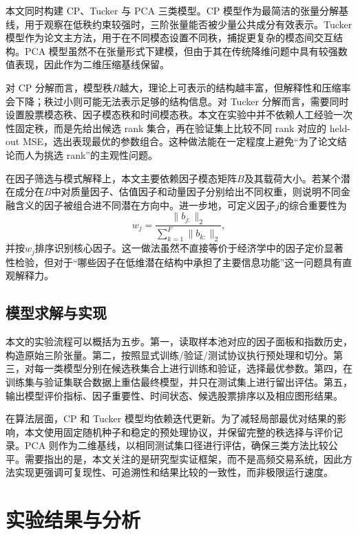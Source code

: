 本文同时构建 CP、Tucker 与 PCA 三类模型。CP 模型作为最简洁的张量分解基线，用于观察在低秩约束较强时，三阶张量能否被少量公共成分有效表示。Tucker 模型作为论文主方法，用于在不同模态设置不同秩，捕捉更复杂的模态间交互结构。PCA 模型虽然不在张量形式下建模，但由于其在传统降维问题中具有较强数值表现，因此作为二维压缩基线保留。

对 CP 分解而言，模型秩$R$越大，理论上可表示的结构越丰富，但解释性和压缩率会下降；秩过小则可能无法表示足够的结构信息。对 Tucker 分解而言，需要同时设置股票模态秩、因子模态秩和时间模态秩。本文在实验中并不依赖人工经验一次性固定秩，而是先给出候选 rank 集合，再在验证集上比较不同 rank 对应的 held-out MSE，选出表现最优的参数组合。这种做法能在一定程度上避免“为了论文结论而人为挑选 rank”的主观性问题。

在因子筛选与模式解释上，本文主要依赖因子模态矩阵$B$及其载荷大小。若某个潜在成分在$B$中对质量因子、估值因子和动量因子分别给出不同权重，则说明不同金融含义的因子被组合进不同潜在方向中。进一步地，可定义因子$j$的综合重要性为
\begin{equation}
w_j=\frac{\|b_{j:}\|_2}{\sum_{k=1}^{F}\|b_{k:}\|_2},
\end{equation}
并按$w_j$排序识别核心因子。这一做法虽然不直接等价于经济学中的因子定价显著性检验，但对于“哪些因子在低维潜在结构中承担了主要信息功能”这一问题具有直观解释力。

\section{模型求解与实现}

本文的实验流程可以概括为五步。第一，读取样本池对应的因子面板和指数历史，构造原始三阶张量。第二，按照显式训练/验证/测试协议执行预处理和切分。第三，对每一类模型分别在候选秩集合上进行训练和验证，选择最优参数。第四，在训练集与验证集联合数据上重估最终模型，并只在测试集上进行留出评估。第五，输出模型评价指标、因子重要性、时间状态、候选股票排序以及相应图形结果。

在算法层面，CP 和 Tucker 模型均依赖迭代更新。为了减轻局部最优对结果的影响，本文使用固定随机种子和稳定的预处理协议，并保留完整的秩选择与评价记录。PCA 则作为二维基线，以相同测试集口径进行评估，确保三类方法比较公平。需要指出的是，本文关注的是研究型实证框架，而不是高频交易系统，因此方法实现更强调可复现性、可追溯性和结果比较的一致性，而非极限运行速度。

\chapter{实验结果与分析}

